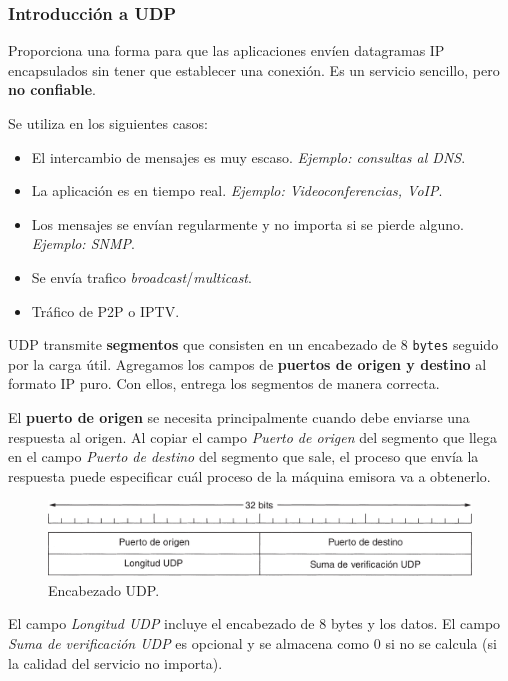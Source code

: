 \documentclass[10pt,a4paper]{article}
\begin{document}
\subsubsection{Introducción a UDP}

Proporciona una forma para que las aplicaciones envíen datagramas IP encapsulados sin tener que establecer una conexión. Es un servicio sencillo, pero \textbf{no confiable}.

Se utiliza en los siguientes casos:
\begin{itemize}
\item El intercambio de mensajes es muy escaso. \textit{Ejemplo: consultas al DNS}.
\item La aplicación es en tiempo real. \textit{Ejemplo: Videoconferencias, VoIP}.
\item Los mensajes se envían regularmente y no importa si se pierde alguno. \textit{Ejemplo: SNMP}.
\item Se envía trafico \textit{broadcast}/\textit{multicast}.
\item Tráfico de P2P o IPTV.
\end{itemize}

UDP transmite \textbf{segmentos} que consisten en un encabezado de 8 \texttt{bytes} seguido por la carga útil. Agregamos los campos de \textbf{puertos de origen y destino} al formato IP puro. Con ellos, entrega los segmentos de manera correcta.

El \textbf{puerto de origen} se necesita principalmente cuando debe enviarse una respuesta al origen. Al copiar el campo \textit{Puerto de origen} del segmento que llega en el campo \textit{Puerto de destino} del segmento que sale, el proceso que envía la respuesta puede especificar cuál proceso de la máquina emisora va a obtenerlo.

\begin{figure}[ht!]
  \caption{Encabezado UDP.}
  \label{fig:udp}
  \centerline{\includegraphics[width=0.85\textwidth-\fboxrule-\fboxrule]{imgs/udp.png}}
\end{figure}

El campo \textit{Longitud UDP} incluye el encabezado de 8 bytes y los datos. El campo \textit{Suma de verificación UDP} es opcional y se almacena como 0 si no se calcula (si la calidad del servicio no importa).
\end{document}
